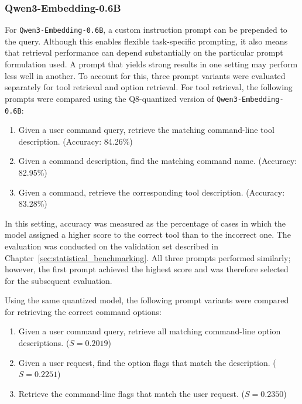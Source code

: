 \subsubsection{Qwen3-Embedding-0.6B}

For \texttt{Qwen3-Embedding-0.6B}, a custom instruction prompt can be prepended to the query. Although this enables flexible task-specific prompting, it also means that retrieval performance can depend substantially on the particular prompt formulation used. A prompt that yields strong results in one setting may perform less well in another. To account for this, three prompt variants were evaluated separately for tool retrieval and option retrieval. For tool retrieval, the following prompts were compared using the Q8-quantized version of \texttt{Qwen3-Embedding-0.6B}:

\begin{enumerate}
    \item Given a user command query, retrieve the matching command-line tool description. (Accuracy: 84.26\%)
    \item Given a command description, find the matching command name. (Accuracy: 82.95\%)
    \item Given a command, retrieve the corresponding tool description. (Accuracy: 83.28\%)
\end{enumerate}

In this setting, accuracy was measured as the percentage of cases in which the model assigned a higher score to the correct tool than to the incorrect one. The evaluation was conducted on the validation set described in Chapter~\ref{sec:statistical_benchmarking}. All three prompts performed similarly; however, the first prompt achieved the highest score and was therefore selected for the subsequent evaluation.

Using the same quantized model, the following prompt variants were compared for retrieving the correct command options:

\begin{enumerate}
    \item Given a user command query, retrieve all matching command-line option descriptions. ($S = 0.2019$)
    \item Given a user request, find the option flags that match the description. ($S = 0.2251$)
    \item Retrieve the command-line flags that match the user request. ($S = 0.2350$)
\end{enumerate}

